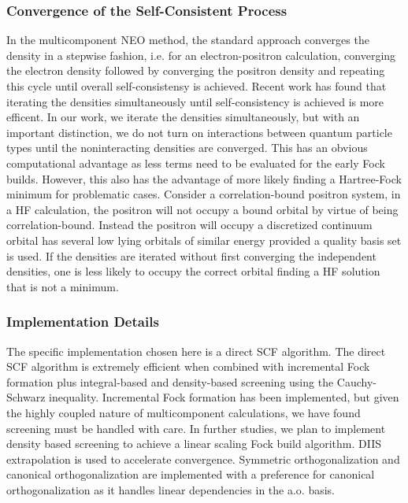 \subsubsection{Convergence of the Self-Consistent Process}
In the multicomponent NEO method, the standard approach converges the density in a stepwise fashion, i.e. for an electron-positron calculation, converging the electron density followed by converging the positron density and repeating this cycle until overall self-consistensy is achieved.
Recent work has found that iterating the densities simultaneously until self-consistency is achieved is more efficent.
In our work, we iterate the densities simultaneously, but with an important distinction, we do not turn on interactions between quantum particle types until the noninteracting densities are converged.
This has an obvious computational advantage as less terms need to be evaluated for the early Fock builds.
However, this also has the advantage of more likely finding a Hartree-Fock minimum for problematic cases.
Consider a correlation-bound positron system, in a HF calculation, the positron will not occupy a bound orbital by virtue of being correlation-bound.
Instead the positron will occupy a discretized continuum orbital has several low lying orbitals of similar energy provided a quality basis set is used.
If the densities are iterated without first converging the independent densities, one is less likely to occupy the correct orbital finding a HF solution that is not a minimum.

\subsubsection{Implementation Details}
The specific implementation chosen here is a direct SCF algorithm.
The direct SCF algorithm is extremely efficient when combined with incremental Fock formation plus integral-based and density-based screening using the Cauchy-Schwarz inequality.
Incremental Fock formation has been implemented, but given the highly coupled nature of multicomponent calculations, we have found screening must be handled with care.
In further studies, we plan to implement density based screening to achieve a linear scaling Fock build algorithm.
DIIS extrapolation is used to accelerate convergence.
Symmetric orthogonalization and canonical orthogonalization are implemented with a preference for canonical orthogonalization as it handles linear dependencies in the a.o. basis.


